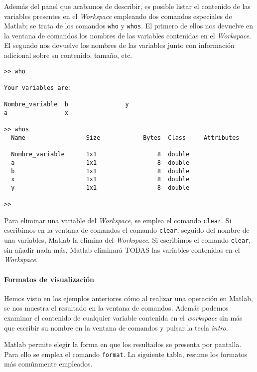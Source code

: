 Además del panel que acabamos de describir, es posible listar el contenido de las variables presentes en el \emph{Workspace} empleando dos comandos especiales de Matlab; se trata de los comandos \texttt{who} y \texttt{whos}. El primero de ellos nos devuelve en la ventana de comandos los nombres de las variables contenidas en el \emph{Workspace}. El segundo nos devuelve los nombres de las variables junto con información adicional sobre su contenido, tamaño, etc.
\begin{verbatim}
>> who

Your variables are:

Nombre_variable  b                y                
a                x                

>> whos
  Name                 Size            Bytes  Class     Attributes

  Nombre_variable      1x1                 8  double              
  a                    1x1                 8  double              
  b                    1x1                 8  double              
  x                    1x1                 8  double              
  y                    1x1                 8  double              

>> 
\end{verbatim}

Para eliminar una variable del \emph{Workspace}, se emplea el comando \texttt{clear}.  Si escribimos en la ventana de comandos el comando \texttt{clear}, seguido del nombre de una variables,  Matlab la elimina del \emph{Workspace}. Si escribimos el comando \texttt{clear}, sin añadir nada más, Matlab eliminará TODAS las variables contenidas en el \emph{Workspace}. 

\paragraph*{Formatos de visualización}
Hemos visto en los ejemplos anteriores cómo al realizar una operación en Matlab, se nos muestra el resultado en la ventana de comandos. Además podemos examinar el contenido de cualquier variable contenida en el \emph{workspace} sin más que escribir su nombre en la ventana de comandos y pulsar la tecla \emph{intro}.

Matlab permite elegir la forma en que los resultados se presenta por pantalla. Para ello se emplea el comando \texttt{format}.  La siguiente tabla, resume los formatos más comúnmente empleados.

